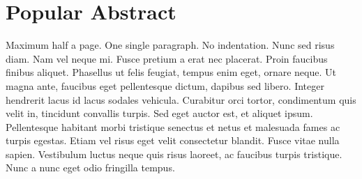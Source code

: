 \section*{Popular Abstract}

\noindent Maximum half a page. One single paragraph. No indentation. Nunc sed risus diam. Nam vel neque mi. Fusce pretium a erat nec placerat. Proin faucibus finibus aliquet. Phasellus ut felis feugiat, tempus enim eget, ornare neque. Ut magna ante, faucibus eget pellentesque dictum, dapibus sed libero. Integer hendrerit lacus id lacus sodales vehicula. Curabitur orci tortor, condimentum quis velit in, tincidunt convallis turpis. Sed eget auctor est, et aliquet ipsum. Pellentesque habitant morbi tristique senectus et netus et malesuada fames ac turpis egestas. Etiam vel risus eget velit consectetur blandit. Fusce vitae nulla sapien. Vestibulum luctus neque quis risus laoreet, ac faucibus turpis tristique. Nunc a nunc eget odio fringilla tempus.
